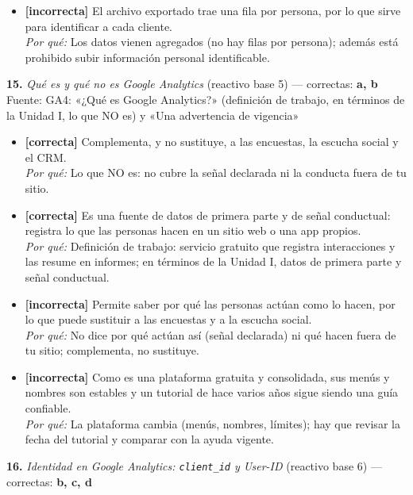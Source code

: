 \documentclass[10pt,letterpaper]{article}
\begin{document}
{\begin{itemize}[leftmargin=1.2em,itemsep=0pt,topsep=1pt,parsep=0pt]
\item[\textbf{d)}] {\footnotesize \textbf{[incorrecta]} El archivo exportado trae una fila por persona, por lo que sirve para identificar a cada cliente.\\ \textit{Por qué:} Los datos vienen agregados (no hay filas por persona); además está prohibido subir información personal identificable.}
\end{itemize}
\vspace{3pt}\noindent\textbf{15.} \textit{Qué es y qué no es Google Analytics} (reactivo base 5) — correctas: \textbf{a, b}\\[-1pt]
{\scriptsize Fuente: GA4: «¿Qué es Google Analytics?» (definición de trabajo, en términos de la Unidad I, lo que NO es) y «Una advertencia de vigencia»}
\begin{itemize}[leftmargin=1.2em,itemsep=0pt,topsep=1pt,parsep=0pt]
\item[\textbf{a)}] {\footnotesize \textbf{[correcta]} Complementa, y no sustituye, a las encuestas, la escucha social y el CRM.\\ \textit{Por qué:} Lo que NO es: no cubre la señal declarada ni la conducta fuera de tu sitio.}
\item[\textbf{b)}] {\footnotesize \textbf{[correcta]} Es una fuente de datos de primera parte y de señal conductual: registra lo que las personas hacen en un sitio web o una app propios.\\ \textit{Por qué:} Definición de trabajo: servicio gratuito que registra interacciones y las resume en informes; en términos de la Unidad I, datos de primera parte y señal conductual.}
\item[\textbf{c)}] {\footnotesize \textbf{[incorrecta]} Permite saber por qué las personas actúan como lo hacen, por lo que puede sustituir a las encuestas y a la escucha social.\\ \textit{Por qué:} No dice por qué actúan así (señal declarada) ni qué hacen fuera de tu sitio; complementa, no sustituye.}
\item[\textbf{d)}] {\footnotesize \textbf{[incorrecta]} Como es una plataforma gratuita y consolidada, sus menús y nombres son estables y un tutorial de hace varios años sigue siendo una guía confiable.\\ \textit{Por qué:} La plataforma cambia (menús, nombres, límites); hay que revisar la fecha del tutorial y comparar con la ayuda vigente.}
\end{itemize}
\vspace{3pt}\noindent\textbf{16.} \textit{Identidad en Google Analytics: \texttt{client\_id} y User-ID} (reactivo base 6) — correctas: \textbf{b, c, d}\\[-1pt]
}
\end{document}
